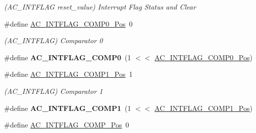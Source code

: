 \begin{DoxyCompactItemize}
\begin{DoxyCompactList}\small\item\em (A\+C\+\_\+\+I\+N\+T\+F\+L\+A\+G reset\+\_\+value) Interrupt Flag Status and Clear \end{DoxyCompactList}\item 
\hypertarget{group___s_a_m_l21___a_c_gabbdc400bbcac3a9c39d34452585974d1}{}\#define \hyperlink{group___s_a_m_l21___a_c_gabbdc400bbcac3a9c39d34452585974d1}{A\+C\+\_\+\+I\+N\+T\+F\+L\+A\+G\+\_\+\+C\+O\+M\+P0\+\_\+\+Pos}~0\label{group___s_a_m_l21___a_c_gabbdc400bbcac3a9c39d34452585974d1}

\begin{DoxyCompactList}\small\item\em (A\+C\+\_\+\+I\+N\+T\+F\+L\+A\+G) Comparator 0 \end{DoxyCompactList}\item 
\hypertarget{group___s_a_m_l21___a_c_gae8edc1d1541cc7e2e674ffc2d1c5b6c0}{}\#define {\bfseries A\+C\+\_\+\+I\+N\+T\+F\+L\+A\+G\+\_\+\+C\+O\+M\+P0}~(1 $<$$<$ \hyperlink{group___s_a_m_l21___a_c_gabbdc400bbcac3a9c39d34452585974d1}{A\+C\+\_\+\+I\+N\+T\+F\+L\+A\+G\+\_\+\+C\+O\+M\+P0\+\_\+\+Pos})\label{group___s_a_m_l21___a_c_gae8edc1d1541cc7e2e674ffc2d1c5b6c0}

\item 
\hypertarget{group___s_a_m_l21___a_c_gab160a35daee4074f1fd5921b02c00acb}{}\#define \hyperlink{group___s_a_m_l21___a_c_gab160a35daee4074f1fd5921b02c00acb}{A\+C\+\_\+\+I\+N\+T\+F\+L\+A\+G\+\_\+\+C\+O\+M\+P1\+\_\+\+Pos}~1\label{group___s_a_m_l21___a_c_gab160a35daee4074f1fd5921b02c00acb}

\begin{DoxyCompactList}\small\item\em (A\+C\+\_\+\+I\+N\+T\+F\+L\+A\+G) Comparator 1 \end{DoxyCompactList}\item 
\hypertarget{group___s_a_m_l21___a_c_ga4c7f6fa574a8eff7ac5587c2cb64cf67}{}\#define {\bfseries A\+C\+\_\+\+I\+N\+T\+F\+L\+A\+G\+\_\+\+C\+O\+M\+P1}~(1 $<$$<$ \hyperlink{group___s_a_m_l21___a_c_gab160a35daee4074f1fd5921b02c00acb}{A\+C\+\_\+\+I\+N\+T\+F\+L\+A\+G\+\_\+\+C\+O\+M\+P1\+\_\+\+Pos})\label{group___s_a_m_l21___a_c_ga4c7f6fa574a8eff7ac5587c2cb64cf67}

\item 
\hypertarget{group___s_a_m_l21___a_c_ga5ec6d9f6399298e5873a182d7c171cd6}{}\#define \hyperlink{group___s_a_m_l21___a_c_ga5ec6d9f6399298e5873a182d7c171cd6}{A\+C\+\_\+\+I\+N\+T\+F\+L\+A\+G\+\_\+\+C\+O\+M\+P\+\_\+\+Pos}~0\label{group___s_a_m_l21___a_c_ga5ec6d9f6399298e5873a182d7c171cd6}


\end{DoxyCompactItemize}
